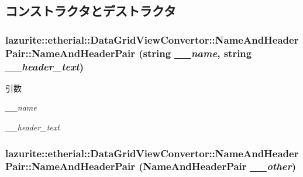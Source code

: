 \subsection{コンストラクタとデストラクタ}
\hypertarget{classlazurite_1_1etherial_1_1_data_grid_view_convertor_1_1_name_and_header_pair_aacdb6a47137572482f93a592338bf27f}{
\subsubsection[{NameAndHeaderPair}]{\setlength{\rightskip}{0pt plus 5cm}lazurite::etherial::DataGridViewConvertor::NameAndHeaderPair::NameAndHeaderPair (string {\em \_\-\_\-name}, \/  string {\em \_\-\_\-header\_\-text})}}
\label{classlazurite_1_1etherial_1_1_data_grid_view_convertor_1_1_name_and_header_pair_aacdb6a47137572482f93a592338bf27f}

\begin{DoxyParams}{引数}
\item[{\em \_\-\_\-name}]\item[{\em \_\-\_\-header\_\-text}]\end{DoxyParams}
\hypertarget{classlazurite_1_1etherial_1_1_data_grid_view_convertor_1_1_name_and_header_pair_aa2f7f9f8f6c2a09127e9cf33ca1dcaa5}{
\subsubsection[{NameAndHeaderPair}]{\setlength{\rightskip}{0pt plus 5cm}lazurite::etherial::DataGridViewConvertor::NameAndHeaderPair::NameAndHeaderPair ({\bf NameAndHeaderPair} {\em \_\-\_\-other})}}
\label{classlazurite_1_1etherial_1_1_data_grid_view_convertor_1_1_name_and_header_pair_aa2f7f9f8f6c2a09127e9cf33ca1dcaa5}

